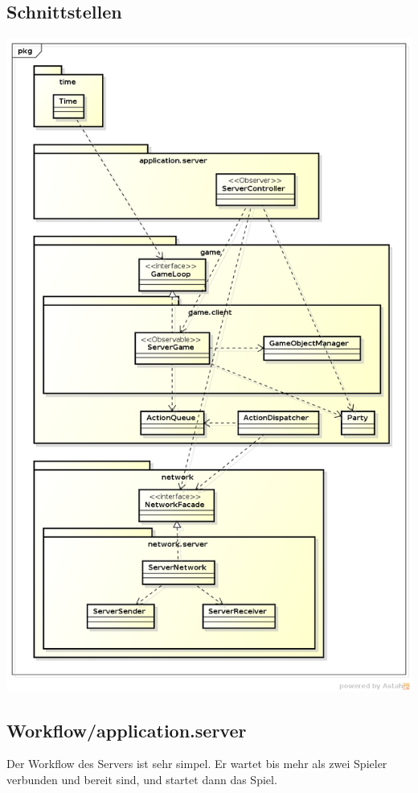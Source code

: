 \documentclass[11pt]{scrartcl}
\begin{document}
\subsection{Schnittstellen}
\includegraphics[scale=0.5]{LogischeSichtServer}


\subsection{Workflow/application.server}

Der Workflow des Servers ist sehr simpel. Er wartet bis mehr als zwei Spieler verbunden und bereit sind, und startet dann das Spiel.
\end{document}
